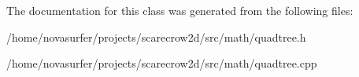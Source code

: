 The documentation for this class was generated from the following files\+:\begin{DoxyCompactItemize}
\item 
/home/novasurfer/projects/scarecrow2d/src/math/quadtree.\+h\item 
/home/novasurfer/projects/scarecrow2d/src/math/quadtree.\+cpp\end{DoxyCompactItemize}
